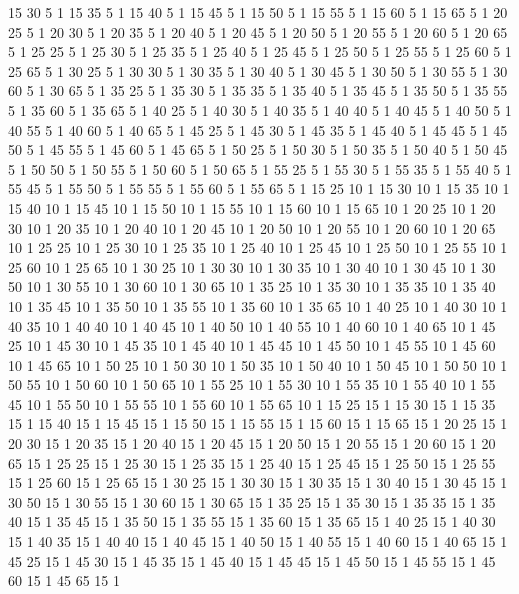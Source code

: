 	15	30	5	1
	15	35	5	1
	15	40	5	1
	15	45	5	1
	15	50	5	1
	15	55	5	1
	15	60	5	1
	15	65	5	1
	20	25	5	1
	20	30	5	1
	20	35	5	1
	20	40	5	1
	20	45	5	1
	20	50	5	1
	20	55	5	1
	20	60	5	1
	20	65	5	1
	25	25	5	1
	25	30	5	1
	25	35	5	1
	25	40	5	1
	25	45	5	1
	25	50	5	1
	25	55	5	1
	25	60	5	1
	25	65	5	1
	30	25	5	1
	30	30	5	1
	30	35	5	1
	30	40	5	1
	30	45	5	1
	30	50	5	1
	30	55	5	1
	30	60	5	1
	30	65	5	1
	35	25	5	1
	35	30	5	1
	35	35	5	1
	35	40	5	1
	35	45	5	1
	35	50	5	1
	35	55	5	1
	35	60	5	1
	35	65	5	1
	40	25	5	1
	40	30	5	1
	40	35	5	1
	40	40	5	1
	40	45	5	1
	40	50	5	1
	40	55	5	1
	40	60	5	1
	40	65	5	1
	45	25	5	1
	45	30	5	1
	45	35	5	1
	45	40	5	1
	45	45	5	1
	45	50	5	1
	45	55	5	1
	45	60	5	1
	45	65	5	1
	50	25	5	1
	50	30	5	1
	50	35	5	1
	50	40	5	1
	50	45	5	1
	50	50	5	1
	50	55	5	1
	50	60	5	1
	50	65	5	1
	55	25	5	1
	55	30	5	1
	55	35	5	1
	55	40	5	1
	55	45	5	1
	55	50	5	1
	55	55	5	1
	55	60	5	1
	55	65	5	1
	15	25	10	1
	15	30	10	1
	15	35	10	1
	15	40	10	1
	15	45	10	1
	15	50	10	1
	15	55	10	1
	15	60	10	1
	15	65	10	1
	20	25	10	1
	20	30	10	1
	20	35	10	1
	20	40	10	1
	20	45	10	1
	20	50	10	1
	20	55	10	1
	20	60	10	1
	20	65	10	1
	25	25	10	1
	25	30	10	1
	25	35	10	1
	25	40	10	1
	25	45	10	1
	25	50	10	1
	25	55	10	1
	25	60	10	1
	25	65	10	1
	30	25	10	1
	30	30	10	1
	30	35	10	1
	30	40	10	1
	30	45	10	1
	30	50	10	1
	30	55	10	1
	30	60	10	1
	30	65	10	1
	35	25	10	1
	35	30	10	1
	35	35	10	1
	35	40	10	1
	35	45	10	1
	35	50	10	1
	35	55	10	1
	35	60	10	1
	35	65	10	1
	40	25	10	1
	40	30	10	1
	40	35	10	1
	40	40	10	1
	40	45	10	1
	40	50	10	1
	40	55	10	1
	40	60	10	1
	40	65	10	1
	45	25	10	1
	45	30	10	1
	45	35	10	1
	45	40	10	1
	45	45	10	1
	45	50	10	1
	45	55	10	1
	45	60	10	1
	45	65	10	1
	50	25	10	1
	50	30	10	1
	50	35	10	1
	50	40	10	1
	50	45	10	1
	50	50	10	1
	50	55	10	1
	50	60	10	1
	50	65	10	1
	55	25	10	1
	55	30	10	1
	55	35	10	1
	55	40	10	1
	55	45	10	1
	55	50	10	1
	55	55	10	1
	55	60	10	1
	55	65	10	1
	15	25	15	1
	15	30	15	1
	15	35	15	1
	15	40	15	1
	15	45	15	1
	15	50	15	1
	15	55	15	1
	15	60	15	1
	15	65	15	1
	20	25	15	1
	20	30	15	1
	20	35	15	1
	20	40	15	1
	20	45	15	1
	20	50	15	1
	20	55	15	1
	20	60	15	1
	20	65	15	1
	25	25	15	1
	25	30	15	1
	25	35	15	1
	25	40	15	1
	25	45	15	1
	25	50	15	1
	25	55	15	1
	25	60	15	1
	25	65	15	1
	30	25	15	1
	30	30	15	1
	30	35	15	1
	30	40	15	1
	30	45	15	1
	30	50	15	1
	30	55	15	1
	30	60	15	1
	30	65	15	1
	35	25	15	1
	35	30	15	1
	35	35	15	1
	35	40	15	1
	35	45	15	1
	35	50	15	1
	35	55	15	1
	35	60	15	1
	35	65	15	1
	40	25	15	1
	40	30	15	1
	40	35	15	1
	40	40	15	1
	40	45	15	1
	40	50	15	1
	40	55	15	1
	40	60	15	1
	40	65	15	1
	45	25	15	1
	45	30	15	1
	45	35	15	1
	45	40	15	1
	45	45	15	1
	45	50	15	1
	45	55	15	1
	45	60	15	1
	45	65	15	1
